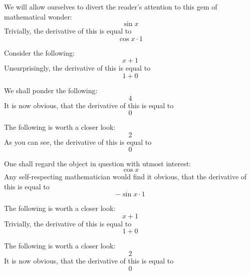 \documentclass{article}
\begin{document}
We will allow ourselves to divert the reader's attention to this gem of mathematical wonder:
\begin{equation}
\sin x 
\end{equation}
Trivially, the derivative of this is equal to
\begin{equation}
\cos x \cdot 1 
\end{equation}

Consider the following:
\begin{equation}
x + 1 
\end{equation}
Unsurprisingly, the derivative of this is equal to
\begin{equation}
1 + 0 
\end{equation}

We shall ponder the following:
\begin{equation}
4 
\end{equation}
It is now obvious, that the derivative of this is equal to
\begin{equation}
0 
\end{equation}

The following is worth a closer look:
\begin{equation}
2 
\end{equation}
As you can see, the derivative of this is equal to
\begin{equation}
0 
\end{equation}

One shall regard the object in question with utmost interest:
\begin{equation}
\cos x 
\end{equation}
Any self-respecting mathematician would find it obvious, that the derivative of this is equal to
\begin{equation}
-\sin x \cdot 1 
\end{equation}

The following is worth a closer look:
\begin{equation}
x + 1 
\end{equation}
Trivially, the derivative of this is equal to
\begin{equation}
1 + 0 
\end{equation}

The following is worth a closer look:
\begin{equation}
2 
\end{equation}
It is now obvious, that the derivative of this is equal to
\begin{equation}
0 
\end{equation}
\end{document}
